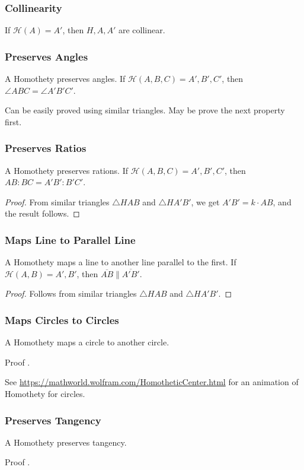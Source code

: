 \documentclass[11pt,twoside]{scrartcl}
\begin{document}
\subsubsection{Collinearity}
If $\mathcal{H}(A) = A'$, then $H, A, A'$ are collinear.
\subsubsection{Preserves Angles}
A Homothety preserves angles. If $\mathcal{H}(A, B, C) = A', B', C'$, then $ \angle ABC = \angle A'B'C'$.
\begin{note}
    Can be easily proved using similar triangles. May be prove the next property first.
\end{note}

\subsubsection{Preserves Ratios}
A Homothety preserves rations. If $\mathcal{H}(A, B, C) = A', B', C'$, then $AB:BC = A'B':B'C'$.
\begin{proof}
    From similar triangles $\triangle HAB$ and $\triangle HA'B'$, we get $A'B' = k \cdot AB$, and the result follows.
\end{proof}

\subsubsection{Maps Line to Parallel Line}
A Homothety maps a line to another line parallel to the first. If $\mathcal{H}(A, B) = A', B'$, then $\overline{AB} \parallel \overline{A'B'}$.
\begin{proof}
    Follows from similar triangles $\triangle HAB$ and $\triangle HA'B'$.
\end{proof}

\subsubsection{Maps Circles to Circles}
A Homothety maps a circle to another circle.
\begin{remark}
    Proof \TBD.
\end{remark}
\begin{remark}
    See \url{https://mathworld.wolfram.com/HomotheticCenter.html} for an animation of Homothety for circles.
\end{remark}

\subsubsection{Preserves Tangency}
A Homothety preserves tangency.
\begin{remark}
    Proof \TBD.
\end{remark}
\end{document}
